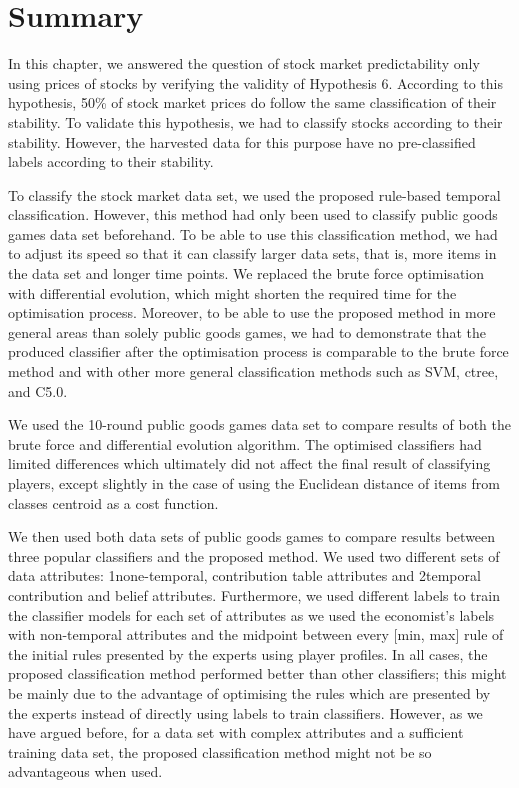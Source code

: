 \section{Summary}

In this chapter, we answered the question of stock market predictability only using prices of stocks by verifying the validity of Hypothesis 6. According to this hypothesis, 50\% of stock market prices do follow the same classification of their stability. To validate this hypothesis, we had to classify stocks according to their stability. However, the harvested data for this purpose have no pre-classified labels according to their stability.

To classify the stock market data set, we used the proposed rule-based temporal classification. However, this method had only been used to classify public goods games data set beforehand. To be able to use this classification method, we had to adjust its speed so that it can classify larger data sets, that is,  more items in the data set and longer time points. We replaced the brute force optimisation with differential evolution, which might shorten the required time for the optimisation process. Moreover, to be able to use the proposed method in more general areas than solely public goods games, we had to demonstrate that the produced classifier after the optimisation process is comparable to the brute force method and with other more general classification methods such as SVM, ctree, and C5.0.

We used the 10-round public goods games data set to compare results of both the brute force and differential evolution algorithm. The optimised classifiers had limited differences which ultimately did not affect the final result of classifying players, except slightly in the case of using the Euclidean distance of items from classes centroid as a cost function.

We then used both data sets of public goods games to compare results between three popular classifiers and the proposed method. We used two different sets of data attributes: 1none-temporal, contribution table attributes and 2temporal contribution and belief attributes. Furthermore, we used different labels to train the classifier models for each set of attributes as we used the economist's labels with non-temporal attributes and the midpoint between every [min, max] rule of the initial rules presented by the experts using player profiles. In all cases, the proposed classification method performed better than other classifiers; this might be mainly due to the advantage of optimising the rules which are presented by the experts instead of directly using labels to train classifiers. However, as we have argued before, for a data set with complex attributes and a sufficient training data set, the proposed classification method might not be so advantageous when used.

